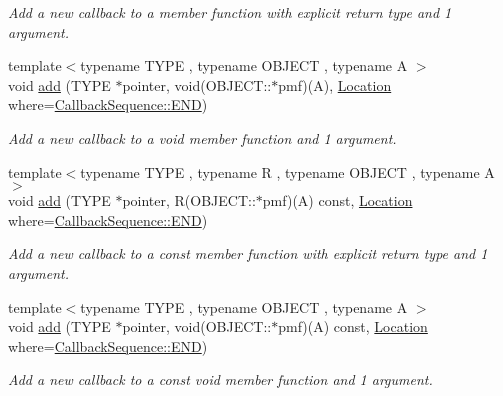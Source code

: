 \begin{DoxyCompactItemize}
\begin{DoxyCompactList}\small\item\em Add a new callback to a member function with explicit return type and 1 argument. \end{DoxyCompactList}\item 
{\footnotesize template$<$typename T\+Y\+PE , typename O\+B\+J\+E\+CT , typename A $>$ }\\void \hyperlink{struct_d_d4hep_1_1_callback_sequence_ad1614bf4af2c4ec1cf7c30f17e9a4ca2}{add} (T\+Y\+PE $\ast$pointer, void(O\+B\+J\+E\+C\+T\+::$\ast$pmf)(A), \hyperlink{struct_d_d4hep_1_1_callback_sequence_a7753490247479633aed16a2376821ef7}{Location} where=\hyperlink{struct_d_d4hep_1_1_callback_sequence_a7753490247479633aed16a2376821ef7ac39eeb1bcfc1c235ab1d0d9315c310ac}{Callback\+Sequence\+::\+E\+ND})
\begin{DoxyCompactList}\small\item\em Add a new callback to a void member function and 1 argument. \end{DoxyCompactList}\item 
{\footnotesize template$<$typename T\+Y\+PE , typename R , typename O\+B\+J\+E\+CT , typename A $>$ }\\void \hyperlink{struct_d_d4hep_1_1_callback_sequence_ac1c60885d1a8ca30427c1e8401c04f23}{add} (T\+Y\+PE $\ast$pointer, R(O\+B\+J\+E\+C\+T\+::$\ast$pmf)(A) const, \hyperlink{struct_d_d4hep_1_1_callback_sequence_a7753490247479633aed16a2376821ef7}{Location} where=\hyperlink{struct_d_d4hep_1_1_callback_sequence_a7753490247479633aed16a2376821ef7ac39eeb1bcfc1c235ab1d0d9315c310ac}{Callback\+Sequence\+::\+E\+ND})
\begin{DoxyCompactList}\small\item\em Add a new callback to a const member function with explicit return type and 1 argument. \end{DoxyCompactList}\item 
{\footnotesize template$<$typename T\+Y\+PE , typename O\+B\+J\+E\+CT , typename A $>$ }\\void \hyperlink{struct_d_d4hep_1_1_callback_sequence_a73f87e27f327c7dc8d51fa61b9019405}{add} (T\+Y\+PE $\ast$pointer, void(O\+B\+J\+E\+C\+T\+::$\ast$pmf)(A) const, \hyperlink{struct_d_d4hep_1_1_callback_sequence_a7753490247479633aed16a2376821ef7}{Location} where=\hyperlink{struct_d_d4hep_1_1_callback_sequence_a7753490247479633aed16a2376821ef7ac39eeb1bcfc1c235ab1d0d9315c310ac}{Callback\+Sequence\+::\+E\+ND})
\begin{DoxyCompactList}\small\item\em Add a new callback to a const void member function and 1 argument. \end{DoxyCompactList}\item 

\end{DoxyCompactItemize}
